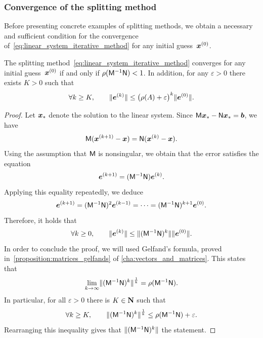 \subsubsection{Convergence of the splitting method}%
\label{ssub:convergence_of_the_basic_splitting_method}
Before presenting concrete examples of splitting methods,
we obtain a necessary and sufficient condition for the convergence of~\eqref{eq:linear_system_iterative_method}
for any initial guess~$\mathbf{\boldsymbol{x}}^{(0)}$.

\begin{proposition}
    [Convergence]
    \label{proposition:linear_convergence}
    The splitting method~\eqref{eq:linear_system_iterative_method} converges for any initial guess~$\mathbf{\boldsymbol{x}}^{(0)}$
    if and only if $\rho(\mathsf M^{-1} \mathsf N) < 1$.
    In addition, for any $\varepsilon > 0$ there exists $K > 0$ such that
    \[
        \forall k \geq K,
        \qquad
        \lVert\mathbf{\boldsymbol{e}}^{(k)}\rVert \leq \bigl(\rho(A) + \varepsilon\bigr)^k \lVert\mathbf{\boldsymbol{e}}^{(0)}\rVert.
    \]
\end{proposition}
\begin{proof}
    Let $\mathbf{\boldsymbol{x}}_*$ denote the solution to the linear system.
    Since $\mathsf M \mathbf{\boldsymbol{x}}_* - \mathsf N \mathbf{\boldsymbol{x}}_* = \mathbf{\boldsymbol{b}}$,
    we have
    \[
        \mathsf M (\mathbf{\boldsymbol{x}}^{(k+1)} - \mathbf{\boldsymbol{x}}) = \mathsf N (\mathbf{\boldsymbol{x}}^{(k)} - \mathbf{\boldsymbol{x}}).
    \]
    Using the assumption that $\mathsf M$ is nonsingular,
    we obtain that the error satisfies the equation
    \[
        \mathbf{\boldsymbol{e}}^{(k+1)} = (\mathsf M^{-1} \mathsf N) \mathbf{\boldsymbol{e}}^{(k)}.
    \]
    Applying this equality repeatedly, we deduce
    \[
        \mathbf{\boldsymbol{e}}^{(k+1)} = (\mathsf M^{-1} \mathsf N)^2 \mathbf{\boldsymbol{e}}^{(k-1)} = \dots = (\mathsf M^{-1} \mathsf N)^{k+1} \mathbf{\boldsymbol{e}}^{(0)}.
    \]
    Therefore,
    it holds that
    \[
        \forall k \geq 0, \qquad
        \norm{\vect e^{(k)}}
        \leq \norm[bigl]{(\mat M^{-1} \mat N)^{k}} \norm{\vect e^{(0)}}.
    \]
    In order to conclude the proof,
    we will used Gelfand's formula,
    proved in~\cref{proposition:matrices_gelfands} of \cref{cha:vectors_and_matrices}.
    This states that
    \[
        \lim_{k \to \infty} \norm[bigl]{(\mat M^{-1} \mat N)^{k}}^{\frac{1}{k}} = \rho(\mat M^{-1} \mat N).
    \]
    In particular, for all $\varepsilon > 0$ there is $K \in \mathbf N$ such that
    \[
        \forall k \geq K, \qquad
        \norm[bigl]{(\mat M^{-1} \mat N)^{k}}^{\frac{1}{k}} \leq \rho(\mat M^{-1} \mat N) + \varepsilon.
    \]
    Rearranging this inequality gives that $\norm[bigl]{(\mat M^{-1} \mat N)^{k}} $ the statement.
\end{proof}

